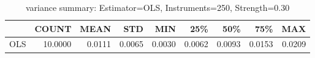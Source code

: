 \begin{table}[ht]
\centering
\caption{variance summary: Estimator=OLS, Instruments=250, Strength=0.30}
\begin{tabular}{lrrrrrrrr}
\toprule
 & COUNT & MEAN & STD & MIN & 25\% & 50\% & 75\% & MAX \\
\midrule
OLS & 10.0000 & 0.0111 & 0.0065 & 0.0030 & 0.0062 & 0.0093 & 0.0153 & 0.0209 \\
\bottomrule
\end{tabular}
\end{table}
